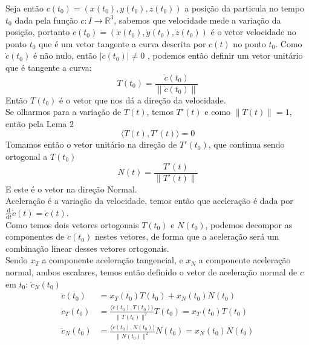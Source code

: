 \documentclass[12pt,letterpaper]{article}
\begin{document}
Seja então \(c(t_0) = (x(t_0), y(t_0), z(t_0))\) a posição da particula no tempo \(t_0\) dada pela função \(c: I \to \mathbb{R}^3\), sabemos que velocidade mede a variação da posição, portanto \(\dot{c}(t_0) = (\dot{x}(t_0), \dot{y}(t_0), \dot{z}(t_0))\) é o vetor velocidade no ponto \(t_0\) que é um vetor tangente a curva descrita por \(c(t)\) no ponto \(t_0\). Como \(\dot{c}(t_0)\) é não nulo, então \(\lvert \dot{c}(t_0) \rvert \neq 0\) , podemos então definir um vetor unitário que é tangente a curva:
\[
T(t_0) = \frac{\dot{c}(t_0)}{\lVert \dot{c}(t_0) \rVert}
\]
Então \(T(t_0)\) é o vetor que nos dá a direção da velocidade.\\
Se olharmos para a variação de \(T(t)\), temos \(T'(t)\) e como \(\lVert T(t) \rVert = 1\), então pela Lema 2 \[\langle T(t), T'(t) \rangle = 0\]
Tomamos então o vetor unitário na direção de \(T'(t_0)\), que continua sendo ortogonal a \(T(t_0)\)\\
\[N(t) = \frac{T'(t)}{\lVert T'(t) \rVert}\]
E este é o vetor na direção Normal.\\
Aceleração é a variação da velocidade, temos então que aceleração é dada por \(\frac{\mathrm{d}}{\mathrm{d}t}\dot{c}(t) = \ddot{c}(t)\).\\
Como temos dois vetores ortogonais \(T(t_0)\) e \(N(t_0)\), podemos decompor as componentes de \(\ddot{c}(t_0)\) nestes vetores, de forma que a aceleração será um combinação linear desses vetores ortogonais.\\
Sendo \(x_T\) a componente aceleração tangencial, e \(x_N\) a componente aceleração normal, ambos escalares, temos então definido o vetor de aceleração normal de \(c\) em \(t_0\): \(\ddot{c}_N(t_0)\)
\begin{align*}
  \ddot{c}(t_0) &= x_T(t_0) T(t_0) + x_N(t_0) N(t_0)\\
  \ddot{c}_T(t_0) &= \frac{\langle \ddot{c}(t_0),T(t_0) \rangle}{\lVert T(t_0) \rVert ^2}T(t_0)  = x_T(t_0) T(t_0)\\
  \ddot{c}_N(t_0) &= \frac{\langle \ddot{c}(t_0),N(t_0) \rangle}{\lVert N(t_0) \rVert ^2}N(t_0)  = x_N(t_0) N(t_0)\\
\end{align*}

\end{document}
